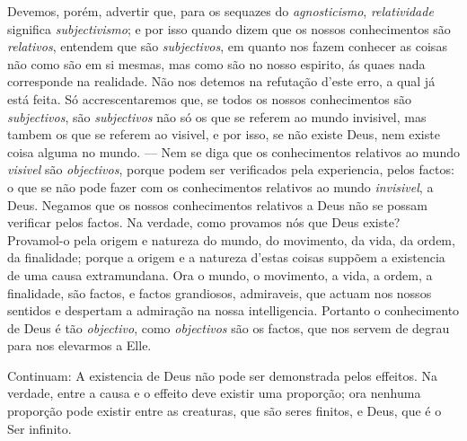 {Devemos, porém, advertir que, para os sequazes do \emph{agnosticismo},
\emph{relatividade} significa \emph{subjectivismo}; e por isso quando dizem que os
nossos conhecimentos são \emph{relativos}, entendem que são \emph{subjectivos}, em
quanto nos fazem conhecer as coisas não como são em si mesmas, mas como são no nosso
espirito, ás quaes nada corresponde na realidade. Não nos detemos na refutação d'este
erro, a qual já está feita. Só accrescentaremos que, se todos os nossos conhecimentos
são \emph{subjectivos}, são \emph{subjectivos} não só os que se referem ao mundo
invisivel, mas tambem os que se referem ao visivel, e por isso, se não existe Deus, nem
existe coisa alguma no mundo. --- Nem se diga que os conhecimentos relativos ao mundo
\emph{visivel} são \emph{objectivos}, porque podem ser verificados pela experiencia,
pelos factos: o que se não pode fazer com os conhecimentos relativos ao mundo
\emph{invisivel}, a Deus. Negamos que os nossos conhecimentos relativos a Deus não se
possam verificar pelos factos. Na verdade, como provamos nós que Deus existe?
Provamol-o pela origem e natureza do mundo, do movimento, da vida, da ordem, da
finalidade; porque a origem e a natureza d'estas coisas suppõem a existencia de uma
causa extramundana. Ora o mundo, o movimento, a vida, a ordem, a finalidade, são
factos, e factos grandiosos, admiraveis, que actuam nos nossos sentidos e despertam a
admiração na nossa intelligencia. Portanto o conhecimento de Deus é tão
\emph{objectivo}, como \emph{objectivos} são os factos, que nos servem de degrau para
nos elevarmos a Elle.

Continuam: A existencia de Deus não pode ser demonstrada pelos effeitos. Na verdade,
entre a causa e o effeito deve existir uma proporção; ora nenhuma proporção pode
existir entre as creaturas, que são seres finitos, e Deus, que é o Ser infinito.

}
